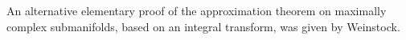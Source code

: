 
An alternative elementary proof of the approximation theorem on maximally complex submanifolds, based on an integral transform, was given by Weinstock.
